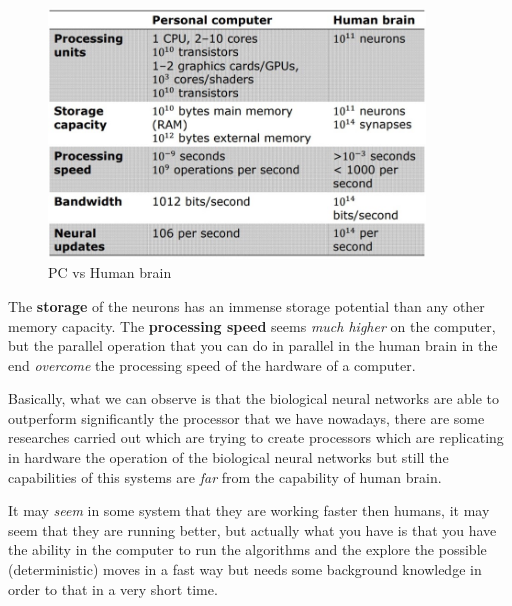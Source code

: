\documentclass{article}
\begin{document}
\begin{figure}[H]
    \centering
    \includegraphics[width=10cm]{images/tab_pc_vs_brain.jpg}
    \caption{PC vs Human brain}
    \label{fig:tab_pc_vs_brain}
\end{figure}

The \textbf{storage} of the neurons has an immense storage potential than any other memory capacity. The \textbf{processing speed}
seems \textit{much higher} on the computer, but the parallel operation that you can do in parallel in the human brain in
the end \textit{overcome} the processing speed of the hardware of a computer.

Basically, what we can observe is that the biological neural networks are able to outperform significantly the processor that
we have nowadays, there are some researches carried out which are trying to create processors which are replicating in
hardware the operation of the biological neural networks but still the capabilities of this systems are \textit{far} from the
capability of human brain.

It may \textit{seem} in some system that they are working faster then humans, it may seem that they are running better, but actually
what you have is that you have the ability in the computer to run the algorithms and the explore the
possible (deterministic) moves in a fast way but needs some background knowledge
in order to that in a very short time.
\end{document}
